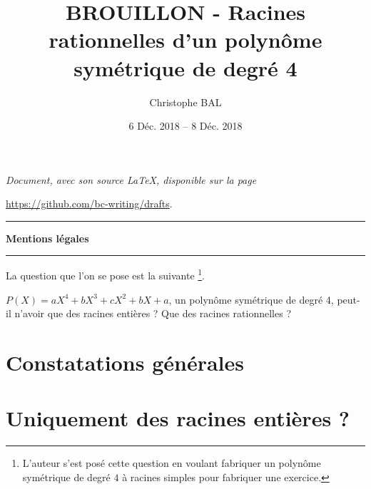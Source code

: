 \documentclass[12pt]{amsart}
\begin{document}
\title{BROUILLON - Racines rationnelles d'un polynôme symétrique de degré 4}
\author{Christophe BAL}
\date{6 Déc. 2018 -- 8 Déc. 2018}
\maketitle



\begin{center}
	\itshape
	Document, avec son source \LaTeX, disponible sur la page
	
	\url{https://github.com/bc-writing/drafts}.
\end{center}


\bigskip


\begin{center}
	\hrule\vspace{.3em}
	{
		\fontsize{1.35em}{1em}\selectfont
		\textbf{Mentions \og légales \fg}
	}
			
	\vspace{0.45em}
	\doclicenseThis
	\hrule
\end{center}


\bigskip

La question que l'on se pose est la suivante
\footnote{
	L'auteur s'est posé cette question en voulant fabriquer un polynôme symétrique de degré $4$ à racines \og simples \fg{} pour fabriquer une exercice.
}.

\medskip

\begin{tcolorbox}
	$P(X) = a X^4 + b X^3 + c X^2 + b X + a$, un polynôme symétrique de degré 4, peut-il n'avoir que des racines entières ? Que des racines rationnelles ?
\end{tcolorbox}


\medskip
\setcounter{tocdepth}{1}
\tableofcontents



\section{Constatations générales}





\section{Uniquement des racines entières ?}


\end{document}
